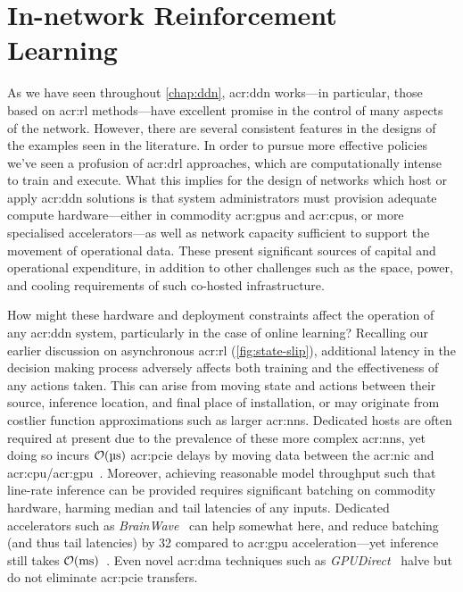 \chapter{In-network Reinforcement Learning}\label{chap:in-net-rl}
As we have seen throughout \cref{chap:ddn}, \gls{acr:ddn} works---in particular, those based on \gls{acr:rl} methods---have excellent promise in the control of many aspects of the network.
However, there are several consistent features in the designs of the examples seen in the literature.
In order to pursue more effective policies we've seen a profusion of \gls{acr:drl} approaches, which are computationally intense to train and execute.
What this implies for the design of networks which host or apply \gls{acr:ddn} solutions is that system administrators must provision adequate compute hardware---either in commodity \glspl{acr:gpu} and \glspl{acr:cpu}, or more specialised accelerators---as well as network capacity sufficient to support the movement of operational data.
These present significant sources of capital and operational expenditure, in addition to other challenges such as the space, power, and cooling requirements of such co-hosted infrastructure.

How might these hardware and deployment constraints affect the operation of any \gls{acr:ddn} system, particularly in the case of online learning?
Recalling our earlier discussion on asynchronous \gls{acr:rl} (\cref{fig:state-slip}), additional latency in the decision making process adversely affects both training and the effectiveness of any actions taken.
This can arise from moving state and actions between their source, inference location, and final place of installation, or may originate from costlier function approximations such as larger \glspl{acr:nn}.
Dedicated hosts are often required at present due to the prevalence of these more complex \glspl{acr:nn}, yet doing so incurs $\mathcal{O}{\left(\text{\si{\micro\second}}\right)}$ \gls{acr:pcie} delays by moving data between the \gls{acr:nic} and \gls{acr:cpu}/\gls{acr:gpu}~\parencite{DBLP:journals/corr/abs-2009-02353,DBLP:conf/sigcomm/NeugebauerAZAL018}.
Moreover, achieving reasonable model throughput such that line-rate inference can be provided requires significant batching on commodity hardware, harming median and tail latencies of any inputs.
Dedicated accelerators such as \emph{BrainWave}~\parencite{DBLP:conf/isca/FowersOPMLLAHAG18} can help somewhat here, and reduce batching (and thus tail latencies) by \qty{32}{\texttimes} compared to \gls{acr:gpu} acceleration---yet inference still takes $\mathcal{O}{\left(\text{\si{\milli\second}}\right)}$~\parencite{Duarte2019}.
Even novel \gls{acr:dma} techniques such as \emph{GPUDirect}~\parencite{gpudirect} halve but do not eliminate \gls{acr:pcie} transfers.

